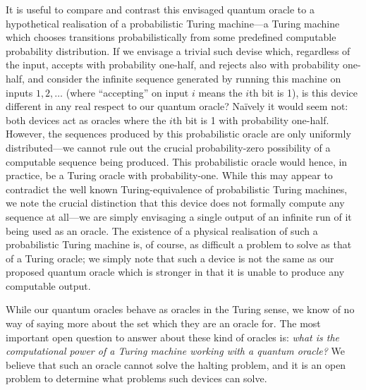 \documentclass[10pt]{article}
\begin{document}
It is useful to compare and contrast this envisaged quantum oracle to a hypothetical realisation of a probabilistic Turing machine---a Turing machine which chooses transitions probabilistically from some predefined computable probability distribution.
If we envisage a trivial such devise which, regardless of the input, accepts with probability one-half, and rejects also with probability one-half, and consider the infinite sequence generated by running this machine on inputs $1,2,\dots$ (where ``accepting'' on input $i$ means the $i$th bit is 1), is this device different in any real respect to our quantum oracle?
Na\"ively it would seem not: both devices act as oracles where the $i$th bit is 1 with probability one-half.
However, the sequences produced by this probabilistic oracle are only uniformly distributed---we cannot rule out the crucial probability-zero possibility of a computable sequence being produced.
This probabilistic oracle would hence, in practice, be a Turing oracle with probability-one.
While this may appear to contradict the well known Turing-equivalence of probabilistic Turing machines, we note the crucial distinction that this device does not formally compute any sequence at all---we are simply envisaging a single output of an infinite run of it being used as an oracle.
The existence of a physical realisation of such a probabilistic Turing machine is, of course, as difficult a problem to solve as that of a Turing oracle; we simply note that such a device is not the same as our proposed quantum oracle which is stronger in that it is unable to produce any computable output.

While our quantum oracles behave as oracles in the Turing sense, we know of no way of saying more about the set which they are an oracle for.
The most important open question to answer about these kind of oracles is: \emph{what is the computational power of a Turing machine working with a quantum oracle?}
We believe that such an oracle cannot solve the halting problem, and it is an open problem to determine what problems such devices can solve.
\end{document}
